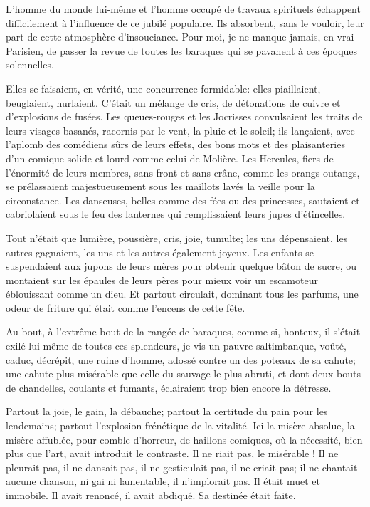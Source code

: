 L’homme du monde lui{}-même et l’homme
occupé de travaux spirituels échappent difficilement à
l’influence de ce jubilé populaire. Ils absorbent,
sans le vouloir, leur part de cette atmosphère
d’insouciance. Pour moi, je ne manque jamais, en vrai
Parisien, de passer la revue de toutes les baraques qui se pavanent à
ces époques solennelles.

Elles se faisaient, en vérité, une concurrence formidable: elles
piaillaient, beuglaient, hurlaient. C’était un mélange
de cris, de détonations de cuivre et d’explosions de
fusées. Les queues{}-rouges et les Jocrisses convulsaient les traits de
leurs visages basanés, racornis par le vent, la pluie et le soleil; ils
lançaient, avec l’aplomb des comédiens sûrs de leurs
effets, des bons mots et des plaisanteries d’un
comique solide et lourd comme celui de Molière. Les Hercules, fiers de
l’énormité de leurs membres, sans front et sans crâne,
comme les orangs{}-outangs, se prélassaient majestueusement sous les
maillots lavés la veille pour la circonstance. Les danseuses, belles
comme des fées ou des princesses, sautaient et cabriolaient sous le feu
des lanternes qui remplissaient leurs jupes
d’étincelles.

Tout n’était que lumière, poussière, cris, joie,
tumulte; les uns dépensaient, les autres gagnaient, les uns et les
autres également joyeux. Les enfants se suspendaient aux jupons de
leurs mères pour obtenir quelque bâton de sucre, ou montaient sur les
épaules de leurs pères pour mieux voir un escamoteur éblouissant comme
un dieu. Et partout circulait, dominant tous les parfums, une odeur de
friture qui était comme l’encens de cette fête.

Au bout, à l’extrême bout de la rangée de baraques,
comme si, honteux, il s’était exilé lui{}-même de
toutes ces splendeurs, je vis un pauvre saltimbanque, voûté, caduc,
décrépit, une ruine d’homme, adossé contre un des
poteaux de sa cahute; une cahute plus misérable que celle du sauvage le
plus abruti, et dont deux bouts de chandelles, coulants et fumants,
éclairaient trop bien encore la détresse.

Partout la joie, le gain, la débauche; partout la certitude du pain pour
les lendemains; partout l’explosion frénétique de la
vitalité. Ici la misère absolue, la misère affublée, pour comble
d’horreur, de haillons comiques, où la nécessité, bien
plus que l’art, avait introduit le contraste. Il ne
riait pas, le misérable ! Il ne pleurait pas, il ne dansait pas, il ne
gesticulait pas, il ne criait pas; il ne chantait aucune chanson, ni
gai ni lamentable, il n’implorait pas. Il était muet
et immobile. Il avait renoncé, il avait abdiqué. Sa destinée était
faite.

